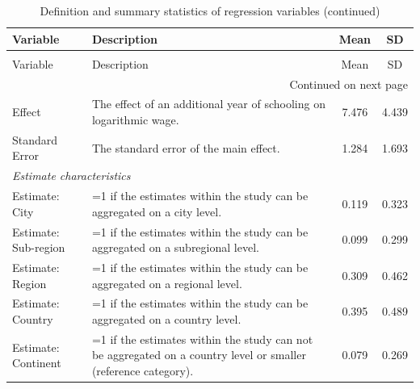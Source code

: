 \begin{singlespace}
\begin{scriptsize}
\begin{longtable}{
@{\hskip\tabcolsep\extracolsep\fill}
l
p{0.55\hsize}
cc
@{}
} %
\caption{Definition and summary statistics of regression variables}  \label{tab:var}\\
\toprule
  \multicolumn{1}{l}{Variable} &   \multicolumn{1}{l}{Description} &         \multicolumn{1}{c}{Mean} &           \multicolumn{1}{c}{SD} \\
\midrule
\endfirsthead
\caption[]{Definition and summary statistics of regression variables (continued)}\\
\toprule
  \multicolumn{1}{l}{Variable} &   \multicolumn{1}{l}{Description} &         \multicolumn{1}{c}{Mean} &           \multicolumn{1}{c}{SD} \\
\midrule
\endhead
\bottomrule
\multicolumn{4}{r}{{\scriptsize Continued on next page}} \\
\endfoot
\endlastfoot
                 Effect &                                                                                       The effect of an additional year of schooling on logarithmic wage. &    7.476 &  4.439 \\
         Standard Error &                                                                                                                   The standard error of the main effect. &    1.284 &  1.693 \\
    \midrule
    
\multicolumn{4}{l}{\emph{Estimate characteristics}}\\	
         Estimate: City &                                                                                  =1 if the estimates within the study can be aggregated on a city level. &    0.119 &  0.323 \\
   Estimate: Sub-region &                                                                           =1 if the estimates within the study can be aggregated on a subregional level. &    0.099 &  0.299 \\
       Estimate: Region &                                                                              =1 if the estimates within the study can be aggregated on a regional level. &    0.309 &  0.462 \\
      Estimate: Country &                                                                               =1 if the estimates within the study can be aggregated on a country level. &    0.395 &  0.489 \\
    Estimate: Continent &                                           =1 if the estimates within the study can not be aggregated on a country level or smaller (reference category). &    0.079 &  0.269 \\
    \midrule 
    

\end{longtable}
\end{scriptsize}
\end{singlespace}
